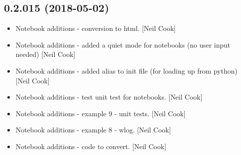 \documentclass[a4paper,10pt,english]{report}
\begin{document}
\subsection{0.2.015 (2018-05-02)}
\label{\detokenize{misc/changelog:id445}}\begin{itemize}
\item {} 
Notebook additions - conversion to html. {[}Neil Cook{]}

\item {} 
Notebook additions - added a quiet mode for notebooks (no user input
needed) {[}Neil Cook{]}

\item {} 
Notebook additions - added  alias to init file (for loading
up from python) {[}Neil Cook{]}

\item {} 
Notebook additions - test unit test for notebooks. {[}Neil Cook{]}

\item {} 
Notebook additions - example 9 - unit tests. {[}Neil Cook{]}

\item {} 
Notebook additions - example 8 - wlog. {[}Neil Cook{]}

\item {} 
Notebook additions - code to convert. {[}Neil Cook{]}

\end{itemize}
\end{document}
